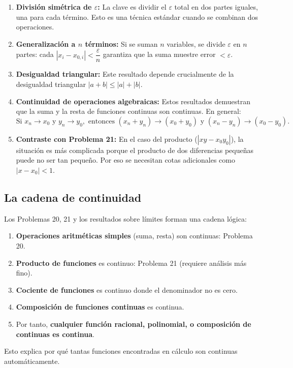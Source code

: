 \begin{enumerate}
\item \textbf{División simétrica de $\varepsilon$:} La clave es dividir el $\varepsilon$ total en dos partes iguales, una para cada término. Esto es una técnica estándar cuando se combinan dos operaciones.

\item \textbf{Generalización a $n$ términos:} Si se suman $n$ variables, se divide $\varepsilon$ en $n$ partes: cada $|x_i - x_{0,i}| < \dfrac{\varepsilon}{n}$ garantiza que la suma muestre error $< \varepsilon$.

\item \textbf{Desigualdad triangular:} Este resultado depende crucialmente de la desigualdad triangular $|a + b| \leq |a| + |b|$.

\item \textbf{Continuidad de operaciones algebraicas:} Estos resultados demuestran que la suma y la resta de funciones continuas son continuas. En general:
\[
\text{Si } x_n \to x_0 \text{ y } y_n \to y_0, \text{ entonces } (x_n + y_n) \to (x_0 + y_0) \text{ y } (x_n - y_n) \to (x_0 - y_0).
\]

\item \textbf{Contraste con Problema 21:} En el caso del producto ($|xy - x_0y_0|$), la situación es más complicada porque el producto de dos diferencias pequeñas puede no ser tan pequeño. Por eso se necesitan cotas adicionales como $|x - x_0| < 1$.
\end{enumerate}

\subsection*{La cadena de continuidad}

Los Problemas 20, 21 y los resultados sobre límites forman una cadena lógica:

\begin{enumerate}
\item \textbf{Operaciones aritméticas simples} (suma, resta) son continuas: Problema 20.
\item \textbf{Producto de funciones} es continuo: Problema 21 (requiere análisis más fino).
\item \textbf{Cociente de funciones} es continuo donde el denominador no es cero.
\item \textbf{Composición de funciones continuas} es continua.
\item Por tanto, \textbf{cualquier función racional, polinomial, o composición de continuas es continua}.
\end{enumerate}

Esto explica por qué tantas funciones encontradas en cálculo son continuas automáticamente.
